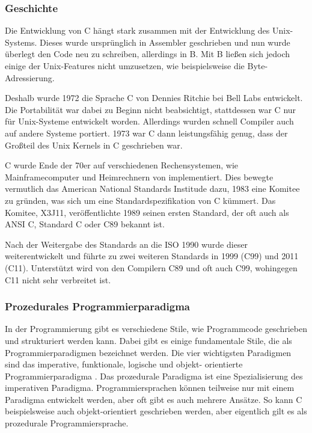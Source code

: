  \subsubsection{Geschichte}
  Die Entwicklung von C hängt stark zusammen mit der Entwicklung des Unix-Systems.
  Dieses wurde ursprünglich in Assembler geschrieben und nun wurde
  überlegt den Code neu zu schreiben, allerdings in B. Mit B ließen sich jedoch
  einige der Unix-Features nicht umzusetzen, wie beispielsweise die Byte-Adressierung.
  
  Deshalb wurde 1972 die Sprache C von Dennies Ritchie bei Bell Labs entwickelt. Die Portabilität war
  dabei zu Beginn nicht beabsichtigt, stattdessen war C nur für Unix-Systeme entwickelt
  worden. Allerdings wurden schnell Compiler auch auf andere Systeme portiert. 1973
  war C dann leistungsfähig genug, dass der Großteil des Unix Kernels in C geschrieben war.
  
  C wurde Ende der 70er auf verschiedenen Rechensystemen, wie Mainframecomputer und
  Heimrechnern von implementiert. Dies bewegte vermutlich das American National Standards
  Institude dazu, 1983 eine Komitee zu gründen, was sich um eine Standardspezifikation von
  C kümmert. Das Komitee, X3J11, veröffentlichte 1989 seinen ersten Standard, der oft auch
  als ANSI C, Standard C oder C89 bekannt ist.
  
  Nach der Weitergabe des Standards an die \ac{ISO} 1990 wurde dieser weiterentwickelt und
  führte zu zwei weiteren Standards in 1999 (C99) und 2011 (C11). Unterstützt wird von den
  Compilern C89 und oft auch C99, wohingegen C11 nicht sehr verbreitet ist. \nocite{ritchie93}
 
 \subsubsection{Prozedurales Programmierparadigma}
  In der Programmierung gibt es verschiedene Stile, wie Programmcode geschrieben und strukturiert
  werden kann. Dabei gibt es einige fundamentale Stile, die als Programmierparadigmen bezeichnet
  werden. Die vier wichtigsten Paradigmen sind das imperative, funktionale, logische und objekt-
  orientierte Programmierparadigma \cite{normark03}. Das prozedurale Paradigma ist eine Spezialisierung des 
  imperativen Paradigma. Programmiersprachen können teilweise nur mit einem Paradigma entwickelt
  werden, aber oft gibt es auch mehrere Ansätze. So kann C beispielsweise auch objekt-orientiert
  geschrieben werden, aber eigentlich gilt es als prozedurale Programmiersprache.
  
